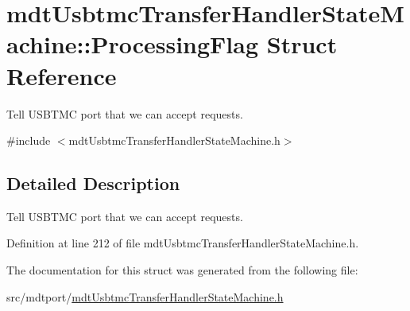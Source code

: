 \hypertarget{structmdt_usbtmc_transfer_handler_state_machine_1_1_processing_flag}{\section{mdt\-Usbtmc\-Transfer\-Handler\-State\-Machine\-:\-:Processing\-Flag Struct Reference}
\label{structmdt_usbtmc_transfer_handler_state_machine_1_1_processing_flag}
}


Tell U\-S\-B\-T\-M\-C port that we can accept requests.  




{\ttfamily \#include $<$mdt\-Usbtmc\-Transfer\-Handler\-State\-Machine.\-h$>$}



\subsection{Detailed Description}
Tell U\-S\-B\-T\-M\-C port that we can accept requests. 

Definition at line 212 of file mdt\-Usbtmc\-Transfer\-Handler\-State\-Machine.\-h.



The documentation for this struct was generated from the following file\-:\begin{DoxyCompactItemize}
\item 
src/mdtport/\hyperlink{mdt_usbtmc_transfer_handler_state_machine_8h}{mdt\-Usbtmc\-Transfer\-Handler\-State\-Machine.\-h}\end{DoxyCompactItemize}
